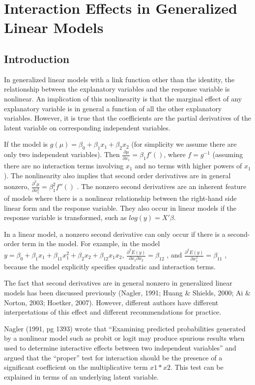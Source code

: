 \chapter{Interaction Effects in Generalized Linear Models}

\section{Introduction}

In generalized linear models with a link function other than the
identity, the relationship between the explanatory variables and the
response variable is nonlinear.  An implication of this nonlinearity
is that the marginal effect of any explanatory variable is in general
a function of all the other explanatory variables.  However, it is
true that the coefficients are the partial derivatives of the latent
variable on corresponding independent variables.

If the model is $g(\mu)=\beta_0+\beta_1 x_1 + \beta_2 x_2$ (for
simplicity we assume there are only two independent variables).  Then
$\frac{\partial \mu}{ \partial x_1}=\beta_1 f'()$, where $f=g^{-1}$
(assuming there are no interaction terms involving $x_1$ and no terms
with higher powers of $x_1$).  The nonlinearity also implies that
second order derivatives are in general nonzero, $\frac{\partial^2
  \mu}{\partial x_1^2}=\beta_1^2 f''()$ .  The nonzero second
derivatives are an inherent feature of models where there is a
nonlinear relationship between the right-hand side linear form and the
response variable.  They also occur in linear models if the response
variable is transformed, such as $log(y)=X'\beta$.

In a linear model, a nonzero second derivative can only occur if there
is a second-order term in the model.  For example, in the model
$y=\beta_0+\beta_1 x_1 + \beta_{11} x_1^2 + \beta_2 x_2 + \beta_{12}
x_1x_2$, $\frac{\partial^2 E(y)}{\partial x_1 \partial
  x_2}=\beta_{12}$ , and $\frac{\partial^2 E(y)}{\partial
  x_1^2}=\beta_{11}$ , because the model explicitly specifies
quadratic and interaction terms.

The fact that second derivatives are in general nonzero in generalized
linear models has been discussed previously (Nagler, 1991; Huang \&
Shields, 2000; Ai \& Norton, 2003; Hoetker, 2007).  However, different
authors have different interpretations of this effect and different
recommendations for practice.

Nagler (1991, pg 1393) wrote that “Examining predicted probabilities
generated by a nonlinear model such as probit or logit may produce
spurious results when used to determine interactive effects between
two independent variables” and argued that the “proper” test for
interaction should be the presence of a significant coefficient on the
multiplicative term $x1*x2$.  This test can be explained in terms of an
underlying latent variable.

